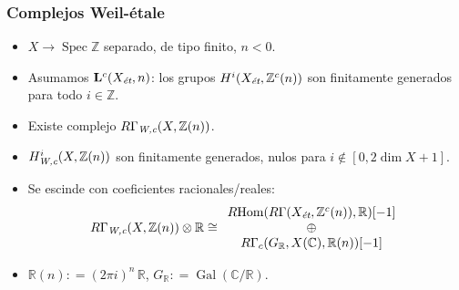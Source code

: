 \documentclass[handout]{beamer}
\newcommand{\CC}{\mathbb{C}}
\newcommand{\FF}{\mathbb{F}}
\newcommand{\QQ}{\mathbb{Q}}
\newcommand{\RR}{\mathbb{R}}
\newcommand{\ZZ}{\mathbb{Z}}
\DeclareMathOperator{\Gal}{Gal}
\newcommand{\dfn}{\mathrel{\mathop:}=}
\DeclareMathOperator{\Hom}{Hom}
\DeclareMathOperator{\Spec}{Spec}
\newcommand{\et}{\text{\it ét}}
\newcommand{\Wc}{\text{\it W,c}}
\newcommand{\RHom}{R\!\Hom}
\begin{document}
\begin{frame}
  \frametitle{Complejos Weil-étale}

  \begin{itemize}
  \item<2-> $X \to \Spec \ZZ$ separado, de tipo finito, $n < 0$.

  \item<3-> Asumamos $\mathbf{L}^c (X_\et, n)$: los grupos
    $H^i (X_\et, \ZZ^c(n))$ son finitamente generados para todo $i \in \ZZ$.

  \item<4-> Existe complejo $R\Gamma_\Wc (X, \ZZ(n))$.

  \item<5-> $H^i_\Wc (X, \ZZ(n))$ son finitamente generados, nulos para
    $i \notin [0, 2\dim X + 1]$.


  \item<6-> Se escinde con coeficientes racionales/reales:
    \[ R\Gamma_\Wc (X, \ZZ(n)) \otimes \RR \cong
      \begin{array}{c}
        \RHom(R\Gamma(X_\et, \ZZ^c(n)), \RR)[-1]\\
        \oplus \\
        R\Gamma_c (G_\RR, X(\CC), \RR(n))[-1]
      \end{array} \]

  \item<7-> $\RR(n) \dfn (2\pi i)^n\,\RR$, $G_\RR \dfn \Gal (\CC/\RR)$.
  \end{itemize}
\end{frame}

\end{document}
